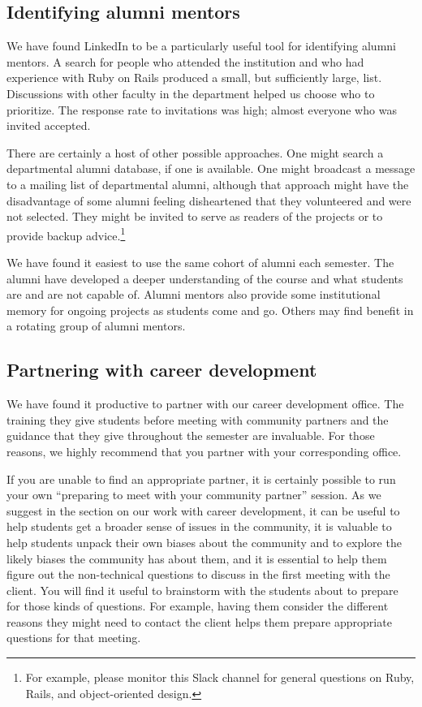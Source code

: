 \subsection{Identifying alumni mentors}

We have found LinkedIn to be a particularly useful tool for identifying
alumni mentors.  A search for people who attended the institution and
who had experience with Ruby on Rails produced a small, but sufficiently
large, list.  Discussions with other faculty in the department helped
us choose who to prioritize.  The response rate to invitations was high;
almost everyone who was invited accepted.

There are certainly a host of other possible approaches.  One might search
a departmental alumni database, if one is available.  One might broadcast
a message to a mailing list of departmental alumni, although that approach
might have the disadvantage of some alumni feeling disheartened that they
volunteered and were not selected.  They might be invited to serve as
readers of the projects or to provide backup advice.\footnote{For example,
please monitor this Slack channel for general questions on Ruby, Rails,
and object-oriented design.} %

We have found it easiest to use the same cohort of alumni each semester.
The alumni have developed a deeper understanding of the course and what
students are and are not capable of.  Alumni mentors also provide some 
institutional memory for ongoing projects as students come and go. 
Others may find benefit in a rotating group of alumni mentors.

\subsection{Partnering with career development}

We have found it productive to partner with our career development
office.  The training they give students before meeting with community
partners and the guidance that they give throughout the semester
are invaluable.  For those reasons, we highly recommend that you
partner with your corresponding office.

If you are unable to find an appropriate partner, it is certainly
possible to run your own ``preparing to meet with your community
partner'' session.  As we suggest in the section on our work with
career development, it can be useful to help students get a broader
sense of issues in the community, it is valuable to help students
unpack their own biases about the community and to explore the
likely biases the community has about them, and it is essential to
help them figure out the non-technical questions to discuss in the
first meeting with the client.  You will find it useful to brainstorm
with the students about to prepare for those kinds of questions.
For example, having them consider the different reasons they might
need to contact the client helps them prepare appropriate questions
for that meeting.

